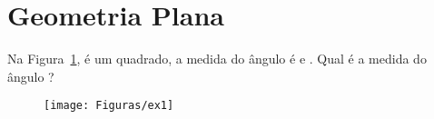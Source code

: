\documentclass[12pt,a4paper]{article}
\begin{document}
\newpage
\section{Geometria Plana}

\begin{exemplo}
Na Figura~\ref{quadrado1},  é um quadrado, a medida do ângulo  é  e
. Qual é a medida do ângulo ?

\begin{figure}[!ht]
\center
\texttt{[image: Figuras/ex1]}
\caption{}
\label{quadrado1}
\end{figure}


\end{exemplo}

\end{document}
